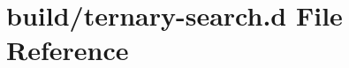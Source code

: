 \hypertarget{ternary-search_8d}{}\section{build/ternary-\/search.d File Reference}
\label{ternary-search_8d}
